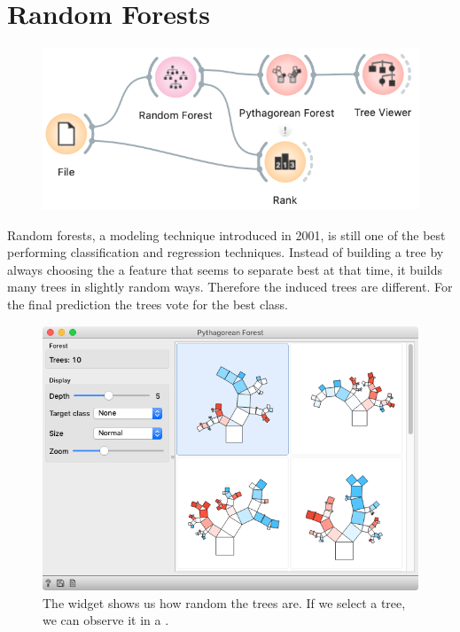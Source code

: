 \chapter{Random Forests}
\label{ch:random_forests}

\begin{figure}
    \vspace{-0.5cm}
    \includegraphics[scale=0.4]{graphics/ch-random_forests/workflow.png}
\end{figure}

Random forests, a modeling technique introduced in 2001, is still one of the best performing classification and regression techniques. Instead of building a tree by always choosing the a feature that seems to separate best at that time, it builds many trees in slightly random ways. Therefore the induced trees are different. For the final prediction the trees vote for the best class.

\begin{figure}[h]
    \centering
    \includegraphics[scale=0.35]{graphics/ch-random_forests/pythagorean.png}
    \caption{The  widget shows us how random the trees are. If we select a tree, we can observe it in a .}
\end{figure}

